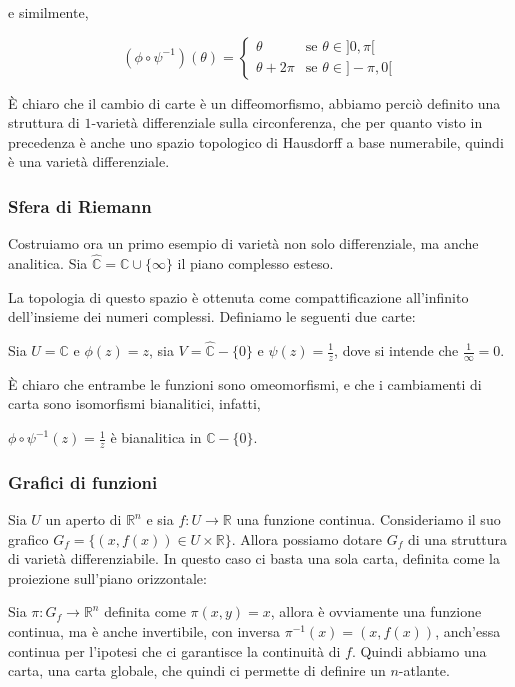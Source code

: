 \documentclass[12pt, a4paper]{article}
\theoremstyle{definition}
\begin{document}
e similmente,

$$
(\phi \circ \psi^{-1})(\theta) = \begin{cases}
    \theta &\text{se $\theta \in ]0, \pi[$}\\
    \theta + 2\pi &\text{se $\theta \in ]-\pi, 0[$}
\end{cases}
$$

È chiaro che il cambio di carte è un diffeomorfismo, abbiamo perciò definito una struttura di $1$-varietà differenziale sulla circonferenza, che per quanto visto in precedenza
è anche uno spazio topologico di Hausdorff a base numerabile, quindi è una varietà differenziale.

\subsubsection{Sfera di Riemann}

Costruiamo ora un primo esempio di varietà non solo differenziale, ma anche analitica. Sia $\hat{\mathbb{C}} = \mathbb{C} \cup \{\infty\}$ il piano complesso esteso.

La topologia di questo spazio è ottenuta come compattificazione all'infinito dell'insieme dei numeri complessi. Definiamo le seguenti due carte:

Sia $U = \mathbb{C}$ e $\phi(z) = z$, sia $V = \hat{\mathbb{C}} - \{0\}$ e $\psi(z) = \frac{1}{z}$, dove si intende che $\frac{1}{\infty} = 0$.

È chiaro che entrambe le funzioni sono omeomorfismi, e che i cambiamenti di carta sono isomorfismi bianalitici, infatti,

$\phi \circ \psi^{-1} (z) = \frac{1}{z}$ è bianalitica in $\mathbb{C} - \{0\}$.

\subsubsection{Grafici di funzioni}
Sia $U$ un aperto di $\mathbb{R}^n$ e sia $f : U \to \mathbb{R}$ una funzione continua. Consideriamo il suo grafico $G_f = \{ (x, f(x)) \in U \times \mathbb{R} \}$.
Allora possiamo dotare $G_f$ di una struttura di varietà differenziabile. In questo caso ci basta una sola carta, definita come la proiezione sull'piano orizzontale:

Sia $\pi : G_f \to \mathbb{R}^n$ definita come $\pi(x, y) = x$, allora è ovviamente una funzione continua, ma è anche invertibile, con inversa $\pi^{-1}(x) = (x, f(x))$,
anch'essa continua per l'ipotesi che ci garantisce la continuità di $f$. Quindi abbiamo una carta, una carta globale, che quindi ci permette di definire un $n$-atlante.
\end{document}
